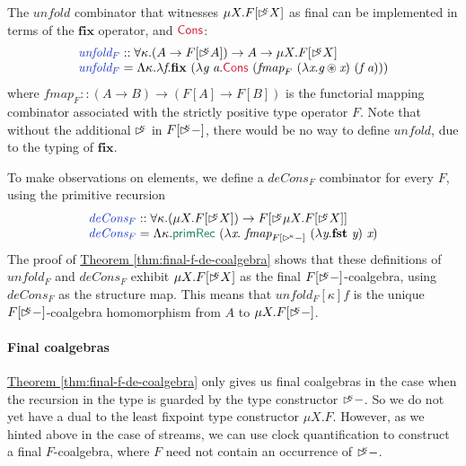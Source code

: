 \documentclass[natbib]{sigplanconf}
\newcommand{\cons}[1]{\textcolor{cons}{\textsf{#1}}}
\newcommand{\elim}[1]{\textcolor{elim}{\textsf{#1}}}
\newcommand{\kw}[1]{\textbf{#1}}
\newcommand{\ident}[1]{\textit{#1}}
\newcommand{\defn}[1]{\textcolor{defnd}{\ident{#1}}}
\newcommand{\delay}[1]{\mathord{\rhd\kern-0.4em^{#1}}}
\newcommand{\delayX}[1]{\mathord{\rhd\kern-0.1em^{#1}}}
\newcommand{\thmref}[1]{\hyperref[#1]{Theorem \ref*{#1}}}
\begin{document}
The $\ident{unfold}$ combinator that witnesses $\mu X. F[\delay\kappa
X]$ as final can be implemented in terms of the $\kw{fix}$ operator,
and $\cons{Cons}$:
\begin{displaymath}
  \begin{array}[t]{l}
    \defn{unfold$_F$} :: \forall \kappa. (A \to F[\delay\kappa A]) \to A \to \mu X. F[\delay\kappa X] \\
    \defn{unfold$_F$} = \Lambda \kappa.\lambda \ident{f}. \kw{fix}\ (\lambda \ident{g}\ \ident{a}. \cons{Cons}\ (\ident{fmap}_F\ (\lambda \ident{x}. \ident{g} \circledast \ident{x})\ (\ident{f}\ \ident{a})))
  \end{array}
\end{displaymath}
where $\ident{fmap}_F :: (A \to B) \to (F[A] \to F[B])$ is the
functorial mapping combinator associated with the strictly positive
type operator $F$. Note that without the additional $\delay\kappa$ in
$F[\delay\kappa -]$, there would be no way to define $\ident{unfold}$,
due to the typing of $\kw{fix}$.

To make observations on elements, we define a $\ident{deCons$_F$}$
combinator for every $F$, using the primitive recursion
\begin{displaymath}
  \begin{array}{l}
    \defn{deCons$_F$} :: \forall \kappa. (\mu X. F[\delay\kappa X]) \to F[\delay\kappa \mu X. F[\delay\kappa X]] \\
    \defn{deCons$_F$} = \Lambda \kappa. \elim{primRec}\ (\lambda \ident{x}.\ \ident{fmap}_{F[\delayX\kappa-]}\ (\lambda \ident{y}.\kw{fst}\ \ident{y})\ \ident{x})
  \end{array}
\end{displaymath}
The proof of \thmref{thm:final-f-de-coalgebra} shows that these
definitions of $\ident{unfold$_F$}$ and $\ident{deCons$_F$}$ exhibit
$\mu X. F[\delay\kappa X]$ as the final $F[\delay\kappa-]$-coalgebra,
using $\ident{deCons$_F$}$ as the structure map. This means that
$\ident{unfold$_F$}[\kappa] f$ is the unique $F[\delay\kappa-]$-coalgebra
homomorphism from $A$ to $\mu X. F[\delay\kappa-]$.

\paragraph{Final coalgebras}
\thmref{thm:final-f-de-coalgebra} only gives us final coalgebras in
the case when the recursion in the type is guarded by the type
constructor $\delay\kappa-$. So we do not yet have a dual to the least
fixpoint type constructor $\mu X. F$. However, as we hinted above in
the case of streams, we can use clock quantification to construct a
final $F$-coalgebra, where $F$ need not contain an occurrence of
$\delay\kappa-$.
\end{document}

